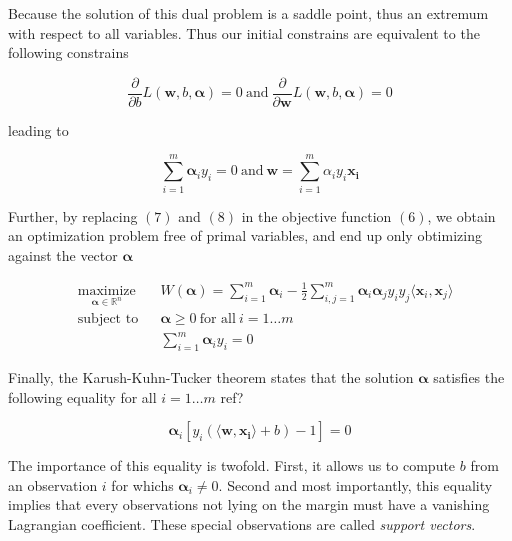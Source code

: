 Because the solution of this dual problem is a saddle point, thus an extremum with respect to all variables. Thus our initial constrains are equivalent to the following constrains

\begin{equation}
  \frac{\partial}{\partial b}L(\mathbf{w}, b, \boldsymbol{\alpha}) = 0
  \ \text{and}\ 
  \frac{\partial}{\partial \mathbf{w}}L(\mathbf{w}, b, \boldsymbol{\alpha}) = 0
\end{equation}

leading to

\begin{equation}
  \sum^m_{i=1} \boldsymbol{\alpha}_iy_i = 0
  \ \text{and}\ 
  \mathbf{w} = \sum^m_{i=1} \alpha_iy_i\mathbf{x_i}
\end{equation}

Further, by replacing $(7)$ and $(8)$ in the objective function $(6)$, we obtain an optimization problem free of primal variables, and end up only obtimizing against the vector $\boldsymbol{\alpha}$

\begin{equation}
  \begin{aligned}
    &\underset{\boldsymbol{\alpha} \in \mathbb{R}^n} {\text{maximize}}
    & & W(\boldsymbol{\alpha}) = \sum_{i=1}^m\boldsymbol{\alpha}_i - \frac{1}{2}\sum_{i,j=1}^m\boldsymbol{\alpha}_i\boldsymbol{\alpha}_jy_iy_j\langle\mathbf{x}_i, \mathbf{x}_j\rangle\\
    &\text{subject to}
    & &\boldsymbol{\alpha} \ge 0\ \text{for all}\ i = 1 \dotsc m\\
    & & &\sum^m_{i=1} \boldsymbol{\alpha}_iy_i = 0
  \end{aligned}
\end{equation}

Finally, the Karush-Kuhn-Tucker theorem states that the solution $\boldsymbol{\alpha}$ satisfies the following equality for all $i = 1\dotsc m$
\textcolor[rgb]{1,0,0}{ref?}

\begin{equation}
  \boldsymbol{\alpha}_i[y_i(\langle \mathbf{w}, \mathbf{x_i}\rangle + b) - 1] = 0
\end{equation}

The importance of this equality is twofold. First, it allows us to compute $b$ from an observation $i$ for whichs $\boldsymbol{\alpha}_i \neq 0$. Second and most importantly, this equality implies that every observations not lying on the margin must have a vanishing Lagrangian coefficient. These special observations are called \textit{support vectors}.

